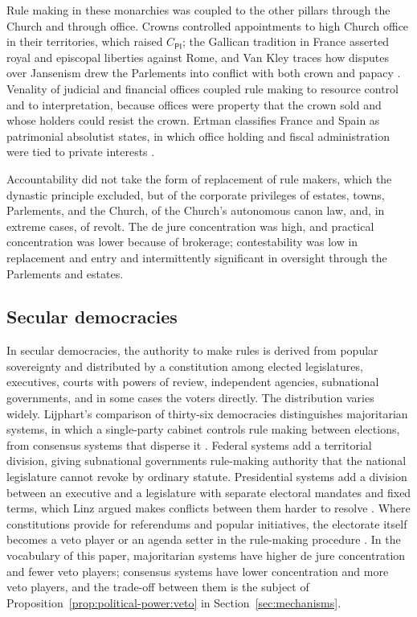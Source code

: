 \documentclass[11pt,letterpaper]{article}
\theoremstyle{definition}
\theoremstyle{remark}
\newcommand{\pP}{\mathsf{P}}
\newcommand{\pI}{\mathsf{I}}
\begin{document}
Rule making in these monarchies was coupled to the other pillars through the Church and through office. Crowns controlled appointments to high Church office in their territories, which raised $C_{\pP\pI}$; the Gallican tradition in France asserted royal and episcopal liberties against Rome, and Van Kley traces how disputes over Jansenism drew the Parlements into conflict with both crown and papacy \citep{vankley1996}. Venality of judicial and financial offices coupled rule making to resource control and to interpretation, because offices were property that the crown sold and whose holders could resist the crown. Ertman classifies France and Spain as patrimonial absolutist states, in which office holding and fiscal administration were tied to private interests \citep{ertman1997}.

Accountability did not take the form of replacement of rule makers, which the dynastic principle excluded, but of the corporate privileges of estates, towns, Parlements, and the Church, of the Church's autonomous canon law, and, in extreme cases, of revolt. The de jure concentration was high, and practical concentration was lower because of brokerage; contestability was low in replacement and entry and intermittently significant in oversight through the Parlements and estates.

\subsection{Secular democracies}

In secular democracies, the authority to make rules is derived from popular sovereignty and distributed by a constitution among elected legislatures, executives, courts with powers of review, independent agencies, subnational governments, and in some cases the voters directly. The distribution varies widely. Lijphart's comparison of thirty-six democracies distinguishes majoritarian systems, in which a single-party cabinet controls rule making between elections, from consensus systems that disperse it \citep{lijphart1999}. Federal systems add a territorial division, giving subnational governments rule-making authority that the national legislature cannot revoke by ordinary statute. Presidential systems add a division between an executive and a legislature with separate electoral mandates and fixed terms, which Linz argued makes conflicts between them harder to resolve \citep{linz1990}. Where constitutions provide for referendums and popular initiatives, the electorate itself becomes a veto player or an agenda setter in the rule-making procedure \citep{lijphart1999}. In the vocabulary of this paper, majoritarian systems have higher de jure concentration and fewer veto players; consensus systems have lower concentration and more veto players, and the trade-off between them is the subject of Proposition~\ref{prop:political-power:veto} in Section~\ref{sec:mechanisms}.
\end{document}
